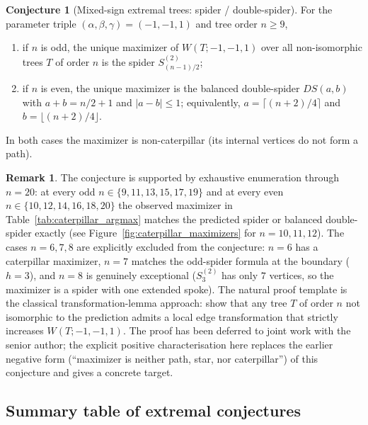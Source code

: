 \documentclass[11pt,a4paper]{article}
\theoremstyle{definition}
\newtheorem{conjecture}[theorem]{Conjecture}
\newtheorem{remark}[theorem]{Remark}
\begin{document}
\begin{conjecture}[Mixed-sign extremal trees: spider / double-spider]
\label{conj:caterpillar_max}
For the parameter triple $(\alpha, \beta, \gamma) = (-1, -1, 1)$
and tree order $n \ge 9$,
\begin{enumerate}[label=(\alph*)]
\item if $n$ is odd, the unique maximizer of $W(T; -1, -1, 1)$
over all non-isomorphic trees $T$ of order $n$ is the spider
$S^{(2)}_{(n-1)/2}$;
\item if $n$ is even, the unique maximizer is the balanced
double-spider $DS(a, b)$ with $a + b = n/2 + 1$ and $|a - b| \le 1$;
equivalently, $a = \lceil (n + 2) / 4 \rceil$ and
$b = \lfloor (n + 2) / 4 \rfloor$.
\end{enumerate}
In both cases the maximizer is non-caterpillar (its internal
vertices do not form a path).
\end{conjecture}

\begin{remark}\label{rem:caterpillar_strategy}
The conjecture is supported by exhaustive enumeration through
$n = 20$: at every odd $n \in \{9, 11, 13, 15, 17, 19\}$ and at
every even $n \in \{10, 12, 14, 16, 18, 20\}$ the observed
maximizer in Table~\ref{tab:caterpillar_argmax} matches the
predicted spider or balanced double-spider exactly
(see Figure~\ref{fig:caterpillar_maximizers} for $n = 10, 11, 12$).
The cases $n = 6, 7, 8$ are explicitly excluded from the
conjecture: $n = 6$ has a caterpillar maximizer, $n = 7$ matches
the odd-spider formula at the boundary ($h = 3$), and $n = 8$ is
genuinely exceptional ($S^{(2)}_3$ has only $7$ vertices, so the
maximizer is a spider with one extended spoke). The natural proof
template is the classical transformation-lemma approach: show that
any tree $T$ of order $n$ not isomorphic to the prediction admits
a local edge transformation that strictly increases
$W(T; -1, -1, 1)$. The proof has been deferred to joint work with
the senior author; the explicit positive characterisation here
replaces the earlier negative form (``maximizer is neither path,
star, nor caterpillar'') of this conjecture and gives a concrete
target.
\end{remark}

\subsection{Summary table of extremal conjectures}
\end{document}
